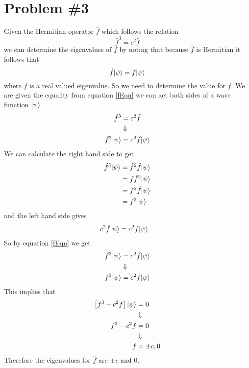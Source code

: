 \documentclass[11pt]{article}
\numberwithin{equation}{section}
\begin{document}
\begin{enumerate}[(a)]
\end{enumerate}

\pagebreak

\section{Problem \#3}
Given the Hermitian operator $\hat{f}$ which follows the relation 
\begin{equation}
\hat{f}^3 = c^2\hat{f}
\label{fEqn}
\end{equation}
we can determine the eigenvalues of $\hat{f}$ by noting that because $\hat{f}$ is Hermitian
it follows that
$$\hat{f}|{\psi}\rangle = f|{\psi}\rangle$$
where $f$ is a real valued eigenvalue. So we need to determine the value for $f$. We are 
given the equality from equation \ref{fEqn} we can act both sides of a wave function 
$|{\psi}\rangle$
\begin{align*}
\hat{f}^3 &= c^2\hat{f}\\
&\Downarrow\\
\hat{f}^3|{\psi}\rangle &= c^2\hat{f}|{\psi}\rangle
\end{align*}
We can calculate the right hand side to get
\begin{align*}
\hat{f}^3|{\psi}\rangle &= \hat{f}^2\hat{f}|{\psi}\rangle\\
&= f\hat{f}^2|{\psi}\rangle\\
&= f^2\hat{f}|{\psi}\rangle\\
&= f^3|{\psi}\rangle
\end{align*}
and the left hand side gives
\begin{align*}
c^2\hat{f}|{\psi}\rangle &= c^2f|{\psi}\rangle
\end{align*}
So by equation \ref{fEqn} we get
\begin{align*}
\hat{f}^3|{\psi}\rangle &= c^2\hat{f}|{\psi}\rangle\\
&\Downarrow\\
f^3|{\psi}\rangle &= c^2f|{\psi}\rangle
\end{align*}
This implies that
\begin{align*}
\left[f^3 - c^2f\right]|{\psi}\rangle &= 0\\
&\Downarrow\\
f^3 - c^2f &= 0\\
&\Downarrow\\
f &= \pm c, 0
\end{align*}
Therefore the eigenvalues for $\hat{f}$ are $\pm c$ and $0$.
\end{document}
